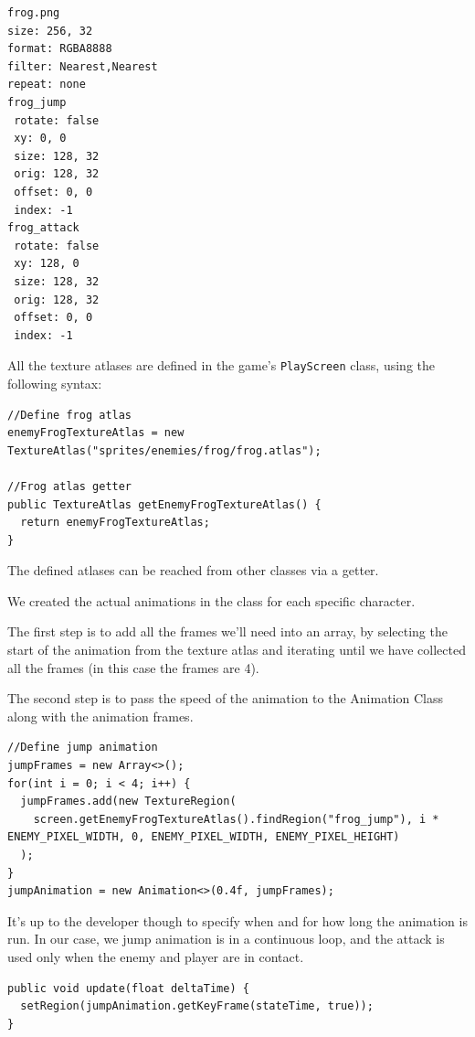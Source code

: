 \documentclass[12p]{article}
\begin{document}
\begin{verbatim}
frog.png
size: 256, 32
format: RGBA8888
filter: Nearest,Nearest
repeat: none
frog_jump
 rotate: false
 xy: 0, 0
 size: 128, 32
 orig: 128, 32
 offset: 0, 0
 index: -1
frog_attack
 rotate: false
 xy: 128, 0
 size: 128, 32
 orig: 128, 32
 offset: 0, 0
 index: -1
\end{verbatim}

All the texture atlases are defined in the game's \texttt{PlayScreen} class, using the following syntax:

\begin{verbatim}
//Define frog atlas
enemyFrogTextureAtlas = new TextureAtlas("sprites/enemies/frog/frog.atlas");

//Frog atlas getter
public TextureAtlas getEnemyFrogTextureAtlas() {
  return enemyFrogTextureAtlas;
}
\end{verbatim}

The defined atlases can be reached from other classes via a getter.

We created the actual animations in the class for each specific character. 

The first step is to add all the frames we'll need into an array, by selecting the start of the animation from the texture atlas and iterating until we have collected all the frames (in this case the frames are 4).

The second step is to pass the speed of the animation to the Animation Class along with the animation frames.

\begin{verbatim}
//Define jump animation
jumpFrames = new Array<>();
for(int i = 0; i < 4; i++) {
  jumpFrames.add(new TextureRegion(
    screen.getEnemyFrogTextureAtlas().findRegion("frog_jump"), i * ENEMY_PIXEL_WIDTH, 0, ENEMY_PIXEL_WIDTH, ENEMY_PIXEL_HEIGHT)
  );
}
jumpAnimation = new Animation<>(0.4f, jumpFrames);
\end{verbatim}

It's up to the developer though to specify when and for how long the animation is run. In our case, we jump animation is in a continuous loop, and the attack is used only when the enemy and player are in contact.

\begin{verbatim}
public void update(float deltaTime) {
  setRegion(jumpAnimation.getKeyFrame(stateTime, true));
}
\end{verbatim}
\end{document}
